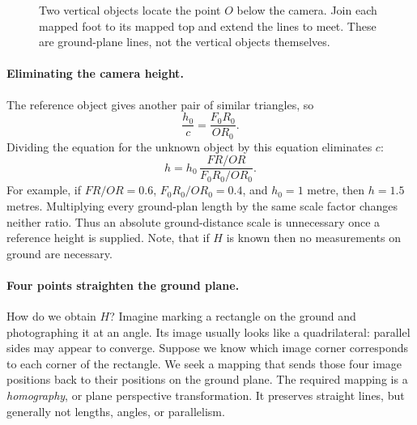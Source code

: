 \begin{figure}[htbp]\centering
{}
\caption{Two vertical objects locate the point $O$ below the camera.
Join each mapped foot to its mapped top and extend the lines to meet.
These are ground-plane lines, not the vertical objects themselves.}
\label{fig:geo-camera-plan}
\end{figure}

\paragraph{Eliminating the camera height.}
The reference object gives another pair of similar triangles, so
\[
\frac{h_0}{c}=\frac{F_0R_0}{OR_0}.
\]
Dividing the equation for the unknown object by this equation eliminates
$c$:
\[
\boxed{h=h_0\,\frac{FR/OR}{F_0R_0/OR_0}.}
\]
For example, if $FR/OR=0.6$, $F_0R_0/OR_0=0.4$, and $h_0=1$ metre,
then $h=1.5$ metres. Multiplying every ground-plan length by the same
scale factor changes neither ratio. Thus an absolute ground-distance scale
is unnecessary once a reference height is supplied. Note, that if $H$ is known then no measurements on ground are necessary.

\paragraph{Four points straighten the ground plane.}
How do we obtain $H$? Imagine marking a rectangle on the ground and
photographing it at an angle. Its image usually looks like a quadrilateral:
parallel sides may appear to converge. Suppose we know which image corner
corresponds to each corner of the rectangle. We seek a mapping that sends
those four image positions back to their positions on the ground plane.
The required mapping is a \emph{homography}, or plane perspective
transformation. It preserves straight lines, but generally not lengths,
angles, or parallelism.

